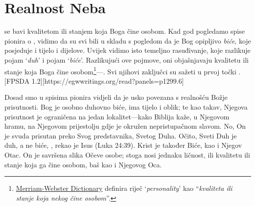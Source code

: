 \chapter{Realnost Neba}

 se bavi kvalitetom ili stanjem koja Boga čine osobom. Kad god pogledamo spise pionira o , vidimo da su svi bili u skladu s pogledom da je Bog opipljivo \textit{biće}, koje posjeduje i tijelo i dijelove. Uvijek vidimo isto temeljno rasuđivanje, koje razlikuje pojam ‘\textit{duh}’ i pojam ‘\textit{biće}’. Razlikujući ove pojmove, oni objašnjavaju kvalitetu ili stanje koja Boga čine osobom\footnote{\href{https://www.merriam-webster.com/dictionary/personality}{Merriam-Webster Dictionary} definira riječ ‘\textit{personality}’ kao “\textit{kvaliteta ili stanje koja nekog čine osobom}”.}—. Svi njihovi zaključci su sažeti u prvoj točki . [FPSDA 1.2][https://egwwritings.org/read?panels=p1299.6]

Dosad smo u spisima pionira vidjeli da je  usko povezana s realnošću Božje prisutnosti. Bog je osobno duhovno biće, ima tijelo i oblik; te kao takav, Njegova prisutnost je ograničena na jedan lokalitet—kako Biblija kaže, u Njegovom hramu, na Njegovom prijestolju gdje je okružen nepristupačnom slavom. No, On je svuda prisutan preko Svog predstavnika, Svetog Duha. Očito, Sveti Duh je duh, a ne biće, , rekao je Isus (Luka 24:39). Krist je također Biće, kao i Njegov Otac. On je savršena slika Očeve osobe; stoga nosi jednaku ličnost, ili kvalitetu ili stanje koja ga čine osobom, baš kao i Njegovog Oca.

